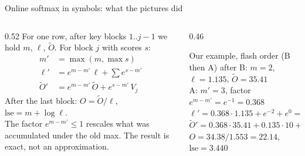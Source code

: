 \documentclass[aspectratio=169,11pt]{beamer}
\begin{document}
\begin{frame}{Online softmax in symbols: what the pictures did}
\begin{columns}[T]
\begin{column}{0.52\textwidth}
For one row, after key blocks $1..j-1$ we hold $m$, $\ell$, $\tilde O$. For block $j$ with scores $s$:
\begin{align*}
m' &= \max(m, \max s)\\
\ell' &= e^{m-m'}\,\ell + \textstyle\sum e^{s-m'}\\
\tilde O' &= e^{m-m'}\,\tilde O + e^{s-m'}\,V_j
\end{align*}
After the last block: $O=\tilde O/\ell$, $\mathrm{lse}=m+\log\ell$.\\[2mm]
\small The factor $e^{m-m'}\le1$ rescales what was accumulated under the old max. The result is exact, not an approximation.
\end{column}
\begin{column}{0.46\textwidth}
\begin{block}{Our example, flash order (B then A)}\small
after B: $m=2$, $\ell=1.135$, $\tilde O=35.41$\\[1mm]
A: $m'=3$, factor $e^{m-m'}=e^{-1}=0.368$\\
\quad $\ell' = 0.368\cdot1.135 + e^{-2}+e^{0} = 1.553$\\
\quad $\tilde O' = 0.368\cdot35.41 + 0.135\cdot10+1\cdot20 = 34.38$\\[1mm]
$O = 34.38/1.553 = 22.14$,\quad $\mathrm{lse} = 3.440$
\end{block}
\end{column}
\end{columns}
\end{frame}
\end{document}
